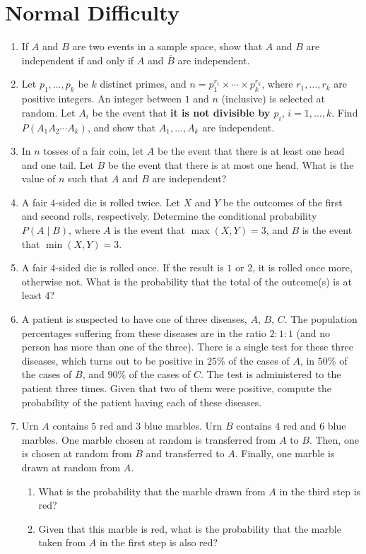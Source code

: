 \documentclass[svgnames]{amsart}
\begin{document}
\section{Normal Difficulty}
\begin{enumerate}[leftmargin=*]
\item If $A$ and $B$ are two events in a sample space, show that $A$ and $B$ are independent if and only if $A$ and $\overline B$ are independent.

\item Let $p_1, \ldots, p_k$ be $k$ distinct primes, and $n = p_1^{r_1} \times \cdots \times p_k^{r_k}$, where $r_1, \ldots, r_k$ are positive integers. An integer between $1$ and $n$ (inclusive) is selected at random. Let $A_i$ be the event that \textbf{it is not divisible by $p_i$}, $i = 1, \ldots, k$. Find $P(A_1 A_2 \cdots A_k)$, and show that $A_1, \ldots, A_k$ are independent.

\item In $n$ tosses of a fair coin, let $A$ be the event that there is at least one head and one tail. Let $B$ be the event that there is at most one head. What is the value of $n$ such that $A$ and $B$ are independent?

\item A fair $4$-sided die is rolled twice. Let $X$ and $Y$ be the outcomes of the first and second rolls, respectively. Determine the conditional probability $P(A \mid B)$, where $A$ is the event that $\max(X, Y) = 3$, and $B$ is the event that $\min(X, Y) = 3$.

\item A fair $4$-sided die is rolled once. If the result is $1$ or $2$, it is rolled once more, otherwise not. What is the probability that the total of the outcome(s) is at least $4$?

\item A patient is suspected to have one of three diseases, $A$, $B$, $C$. The population percentages suffering from these diseases are in the ratio $2:1:1$ (and no person has more than one of the three). There is a single test for these three diseases, which turns out to be positive in $25\%$ of the cases of $A$, in $50\%$ of the cases of $B$, and $90\%$ of the cases of $C$. The test is administered to the patient three times. Given that two of them were positive, compute the probability of the patient having each of these diseases.

\item Urn $A$ contains $5$ red and $3$ blue marbles. Urn $B$ contains $4$ red and $6$ blue marbles. One marble chosen at random is transferred from $A$ to $B$. Then, one is chosen at random from $B$ and transferred to $A$. Finally, one marble is drawn at random from $A$.
\begin{enumerate}
	\item What is the probability that the marble drawn from $A$ in the third step is red?
	\item Given that this marble is red, what is the probability that the marble taken from $A$ in the first step is also red?
\end{enumerate}
\end{enumerate} %
\end{document}
